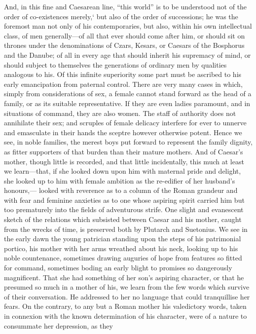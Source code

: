 And, in this fine and Caesarean line, ``this world'' is to be understood
not of the order of co-existences merely,` but also of the order of
successions; he was the foremost man not only of his contemporaries, but
also, within his own intellectual class, of men generally—of all that
ever should come after him, or should sit on thrones under the
denominations of Czars, Kesars, or Caesars of the Bosphorus and the
Danube; of all in every age that should inherit his supremacy of mind,
or should subject to themselves the generations of ordinary men by
qualities analogous to his. Of this infinite superiority some part must
be ascribed to his early emancipation from paternal control. There are
very many cases in which, simply from considerations of sex, a female
cannot stand forward as the head of a family, or as its suitable
representative. If they are even ladies paramount, and in situations of
command, they are also women. The staff of authority does not annihilate
their sex; and scruples of female delicacy interfere for ever to unnerve
and emasculate in their hands the sceptre however otherwise potent.
Hence we see, in noble families, the merest boys put forward to
represent the family dignity, as fitter supporters of that burden than
their mature mothers. And of Caesar's mother, though little is recorded,
and that little incidentally, this much at least we learn—that, if she
looked down upon him with maternal pride and delight, she looked up to
him with female ambition as the re-edifier of her husband's honours,—
looked with reverence as to a column of the Roman grandeur and with fear
and feminine anxieties as to one whose aspiring spirit carried him but
too prematurely into the fields of adventurous strife. One slight and
evanescent sketch of the relations which subsisted between Caesar and
his mother, caught from the wrecks of time, is preserved both by
Plutarch and Suetonius. We see in the early dawn the young patrician
standing upon the steps of his patrimonial portico, his mother with her
arms wreathed about his neck, looking up to his noble countenance,
sometimes drawing auguries of hope from features so fitted for command,
sometimes boding an early blight to promises so dangerously magnificent.
That she had something of her son's aspiring character, or that he
presumed so much in a mother of his, we learn from the few words which
survive of their conversation. He addressed to her no language that
could tranquillise her fears. On the contrary, to any but a Roman mother
his valedictory words, taken in connexion with the known determination
of his character, were of a nature to consummate her depression, as they

